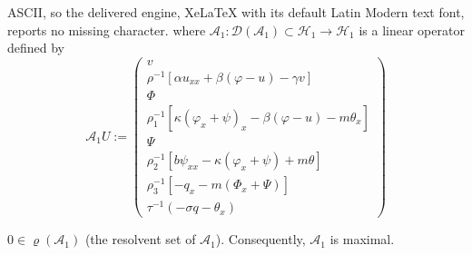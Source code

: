 \documentclass[10pt,a4paper]{amsart}
\begin{document}
ASCII, so the delivered engine, XeLaTeX with its default Latin Modern text font, reports no missing character.
where \(\mathcal{A}_1: \mathcal{D}(\mathcal{A}_1) \subset \mathcal{H}_1 \to \mathcal{H}_1\) is a linear operator defined by \begin{equation}\label{definition:A-1}
	\mathcal{A}_1 U := \begin{pmatrix}
		v \\
		\rho^{-1} \left[ \alpha u_{xx} + \beta (\varphi - u) - \gamma v \right] \\
		\Phi \\
		\rho_1^{-1} \left[ \kappa (\varphi_x + \psi)_x - \beta (\varphi - u) - m \theta_x \right] \\
		\Psi \\
		\rho_2^{-1} \left[ b \psi_{xx} - \kappa (\varphi_x + \psi) + m\theta \right] \\
		\rho_3^{-1} \left[ -q_x - m (\Phi_x + \Psi) \right] \\
		\tau^{-1}(-\sigma q - \theta_x)
	\end{pmatrix}
\end{equation}

\begin{lemma}\label{maximal-1}
	$0 \in \varrho(\mathcal{A}_1)$ (the resolvent set of $\mathcal{A}_1$). Consequently, $\mathcal{A}_1$ is maximal.
\end{lemma}
\end{document}
